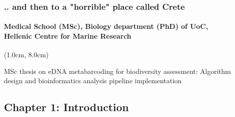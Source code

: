 \documentclass{beamer}
\begin{document}
   \begin{frame}

      \frametitle{.. and then to a "horrible" place called Crete}
      \framesubtitle{
         Medical School (MSc), Biology department (PhD) of UoC, \\
         Hellenic Centre for Marine Research
         }


      \begin{textblock*}{10cm}(1.0cm, 8.0cm)

         \small MSc thesis on eDNA metabarcoding for biodiversity assessment: 
         Algorithm design and bioinformatics analysis pipeline implementation
         
      \end{textblock*}


   \end{frame}
   \fi


   \begin{darkframes}
      \section{
         \textbf{Chapter 1}: Introduction
      }
   \end{darkframes}
\end{document}
